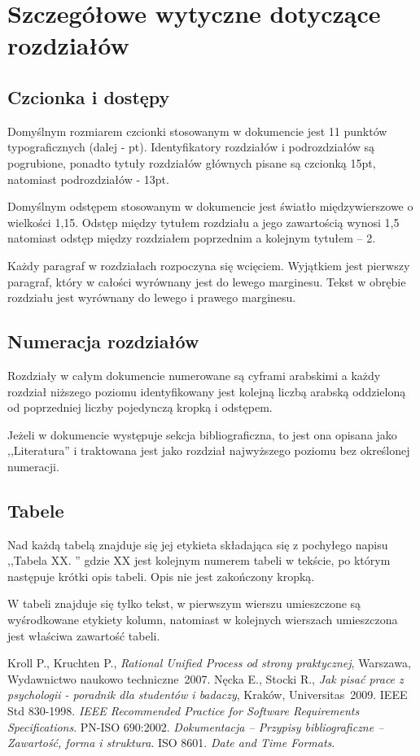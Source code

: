 \documentclass [11pt, a4paper, leqno]	{article}	%
\begin{document}
\section{Szczegółowe wytyczne dotyczące rozdziałów}

\subsection{Czcionka i dostępy}
\noindent
Domyślnym rozmiarem czcionki stosowanym w dokumencie jest 11 punktów typograficznych (dalej - pt). Identyfikatory rozdziałów i podrozdziałów są pogrubione, ponadto tytuły rozdziałów głównych pisane są czcionką 15pt, natomiast podrozdziałów - 13pt.

Domyślnym odstępem stosowanym w dokumencie jest światło międzywierszowe o wielkości 1,15. Odstęp między tytułem rozdziału a jego zawartością wynosi 1,5 natomiast odstęp między rozdziałem poprzednim a kolejnym tytułem -- 2.
	
Każdy paragraf w rozdziałach rozpoczyna się wcięciem. Wyjątkiem jest pierwszy paragraf, który w całości wyrównany jest do lewego marginesu.  Tekst w obrębie rozdziału jest wyrównany do lewego i prawego marginesu.

\subsection{Numeracja rozdziałów}
\noindent
Rozdziały w całym dokumencie numerowane są cyframi arabskimi a każdy rozdział niższego poziomu identyfikowany jest kolejną liczbą arabską oddzieloną od poprzedniej liczby pojedynczą kropką i odstępem. 

Jeżeli w dokumencie występuje sekcja bibliograficzna, to jest ona opisana jako ,,Literatura'' i traktowana jest jako rozdział najwyższego poziomu bez określonej numeracji. 

\subsection{Tabele}
\noindent
Nad każdą tabelą znajduje się jej etykieta składająca się z pochyłego napisu ,,Tabela XX. '' gdzie XX jest kolejnym numerem tabeli w tekście, po którym następuje krótki opis tabeli. Opis nie jest zakończony kropką. 

W tabeli znajduje się tylko tekst, w pierwszym wierszu umieszczone są wyśrodkowane etykiety kolumn, natomiast w kolejnych wierszach umieszczona jest właściwa zawartość tabeli. 

\newpage
{}
\begin{thebibliography}{2}
	 Kroll P., Kruchten P., \emph{Rational Unified Process od strony praktycznej}, Warszawa, Wydawnictwo naukowo techniczne~2007.
	 Nęcka E., Stocki R., \emph{Jak pisać prace z psychologii - poradnik dla studentów i badaczy}, Kraków, Universitas~2009.
	 IEEE Std 830-1998. \emph{IEEE Recommended Practice for Software Requirements Specifications}.
	 PN-ISO 690:2002. \emph{Dokumentacja – Przypisy bibliograficzne – Zawartość, forma i struktura}.
	 ISO 8601. \emph{Date and Time Formats}.
\end{thebibliography}
\end{document}

